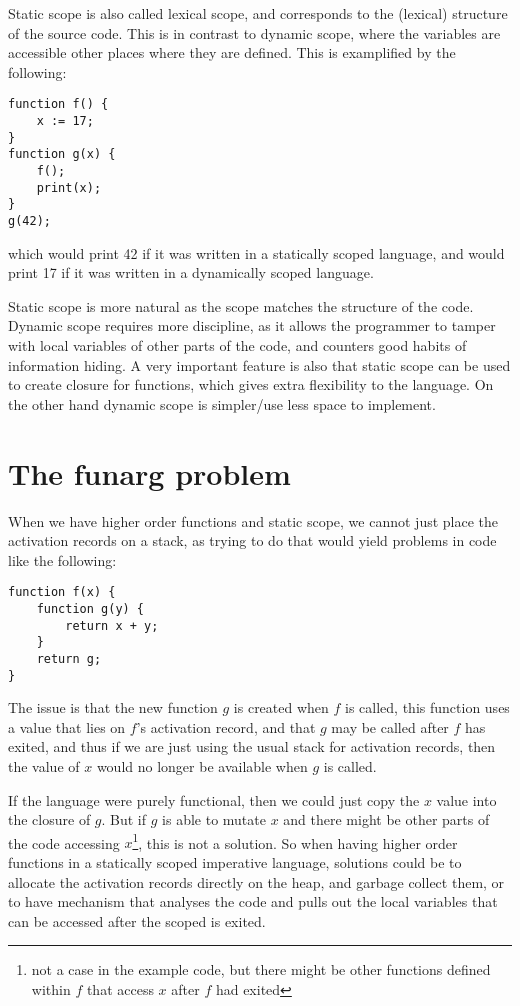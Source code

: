 Static scope is also called lexical scope, and corresponds to the (lexical) structure of the source code.
This is in contrast to dynamic scope, where the variables are accessible other places where they are defined. This is examplified by the following:
{\scriptsize
\begin{verbatim}
function f() {
    x := 17;
}
function g(x) {
    f();
    print(x);
}
g(42);
\end{verbatim}
}
which would print 42 if it was written in a statically scoped language, and would print 17 if it was written in a dynamically scoped language.

Static scope is more natural as the scope matches the structure of the code. Dynamic scope requires more discipline, as it allows the programmer to tamper with local variables of other parts of the code, and counters good habits of information hiding. 
A very important feature is also that static scope can be used to create closure for functions, which gives extra flexibility to the language.  
On the other hand dynamic scope is simpler/use less space to implement.

\section{The funarg problem}
When we have higher order functions and static scope, we cannot just place the activation records on a stack, as trying to do that would yield problems in code like the following:
{\scriptsize
\begin{verbatim}
function f(x) {
    function g(y) {
        return x + y;
    } 
    return g;
}
\end{verbatim}
}
The issue is that the new function $g$ is created when $f$ is called, this function uses a value that lies on $f$'s activation record, and that $g$ may be called after $f$ has exited, and thus if we are just using the usual stack for activation records, then the value of $x$ would no longer be available when $g$ is called.

If the language were purely functional, then we could just copy the $x$ value into the closure of $g$. But if $g$ is able to mutate $x$ and there might be other parts of the code accessing $x$\footnote{not a case in the example code, but there might be other functions defined within $f$ that access $x$ after $f$ had exited}, this is not a solution.
So when having higher order functions in a statically scoped imperative language, solutions could be to allocate the activation records directly on the heap, and garbage collect them, or to have mechanism that analyses the code and pulls out the local variables that can be accessed after the scoped is exited.

